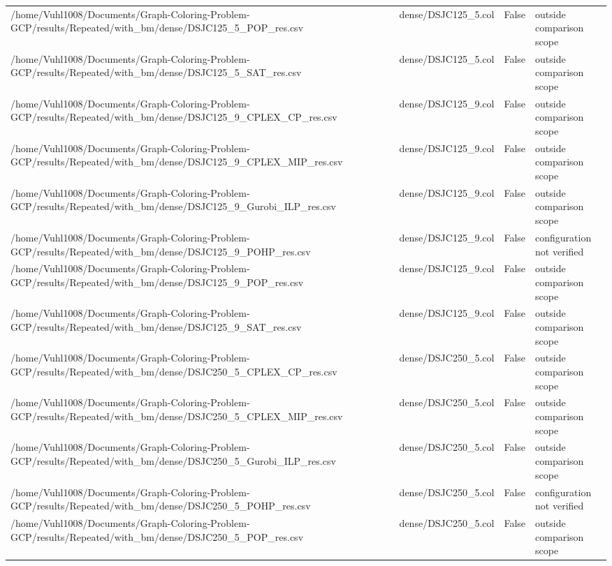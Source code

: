 \begin{table}[htbp]
\begin{tabular}{llll}
/home/Vuhl1008/Documents/Graph-Coloring-Problem-GCP/results/Repeated/with\_bm/dense/DSJC125\_5\_POP\_res.csv & dense/DSJC125\_5.col & False & outside comparison scope \\
/home/Vuhl1008/Documents/Graph-Coloring-Problem-GCP/results/Repeated/with\_bm/dense/DSJC125\_5\_SAT\_res.csv & dense/DSJC125\_5.col & False & outside comparison scope \\
/home/Vuhl1008/Documents/Graph-Coloring-Problem-GCP/results/Repeated/with\_bm/dense/DSJC125\_9\_CPLEX\_CP\_res.csv & dense/DSJC125\_9.col & False & outside comparison scope \\
/home/Vuhl1008/Documents/Graph-Coloring-Problem-GCP/results/Repeated/with\_bm/dense/DSJC125\_9\_CPLEX\_MIP\_res.csv & dense/DSJC125\_9.col & False & outside comparison scope \\
/home/Vuhl1008/Documents/Graph-Coloring-Problem-GCP/results/Repeated/with\_bm/dense/DSJC125\_9\_Gurobi\_ILP\_res.csv & dense/DSJC125\_9.col & False & outside comparison scope \\
/home/Vuhl1008/Documents/Graph-Coloring-Problem-GCP/results/Repeated/with\_bm/dense/DSJC125\_9\_POHP\_res.csv & dense/DSJC125\_9.col & False & configuration not verified \\
/home/Vuhl1008/Documents/Graph-Coloring-Problem-GCP/results/Repeated/with\_bm/dense/DSJC125\_9\_POP\_res.csv & dense/DSJC125\_9.col & False & outside comparison scope \\
/home/Vuhl1008/Documents/Graph-Coloring-Problem-GCP/results/Repeated/with\_bm/dense/DSJC125\_9\_SAT\_res.csv & dense/DSJC125\_9.col & False & outside comparison scope \\
/home/Vuhl1008/Documents/Graph-Coloring-Problem-GCP/results/Repeated/with\_bm/dense/DSJC250\_5\_CPLEX\_CP\_res.csv & dense/DSJC250\_5.col & False & outside comparison scope \\
/home/Vuhl1008/Documents/Graph-Coloring-Problem-GCP/results/Repeated/with\_bm/dense/DSJC250\_5\_CPLEX\_MIP\_res.csv & dense/DSJC250\_5.col & False & outside comparison scope \\
/home/Vuhl1008/Documents/Graph-Coloring-Problem-GCP/results/Repeated/with\_bm/dense/DSJC250\_5\_Gurobi\_ILP\_res.csv & dense/DSJC250\_5.col & False & outside comparison scope \\
/home/Vuhl1008/Documents/Graph-Coloring-Problem-GCP/results/Repeated/with\_bm/dense/DSJC250\_5\_POHP\_res.csv & dense/DSJC250\_5.col & False & configuration not verified \\
/home/Vuhl1008/Documents/Graph-Coloring-Problem-GCP/results/Repeated/with\_bm/dense/DSJC250\_5\_POP\_res.csv & dense/DSJC250\_5.col & False & outside comparison scope \\

\end{tabular}
\end{table}
